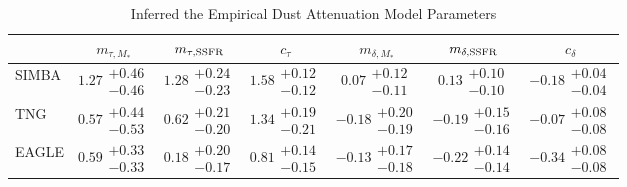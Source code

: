 
\begin{table}
    \caption{Inferred the Empirical Dust Attenuation Model Parameters}
    \begin{tabular}{lcccccc} \toprule
        & $m_{\tau,M_*}$ & $m_{\tau,{\rm SSFR}}$ & $c_\tau$ & $m_{\delta,M_*}$ & $m_{\delta,{\rm SSFR}}$ & $c_\delta$ \\[3pt] \hline\hline
        SIMBA   & $1.27\substack{+0.46\\-0.46}$ &
        $1.28\substack{+0.24\\-0.23}$ & $1.58\substack{+0.12\\-0.12}$ &
        $0.07 \substack{+0.12\\-0.11}$ & $0.13 \substack{+0.10\\-0.10}$ &
        $-0.18\substack{+0.04\\-0.04}$ \\
        TNG     & $0.57\substack{+0.44\\-0.53}$ &
        $0.62\substack{+0.21\\-0.20}$ & $1.34\substack{+0.19\\-0.21}$ &
        $-0.18\substack{+0.20\\-0.19}$ & $-0.19\substack{+0.15\\-0.16}$ &
        $-0.07\substack{+0.08\\-0.08}$ \\
        EAGLE   & $0.59\substack{+0.33\\-0.33}$ &
        $0.18\substack{+0.20\\-0.17}$ & $0.81\substack{+0.14\\-0.15}$ &
        $-0.13\substack{+0.17\\-0.18}$ & $-0.22\substack{+0.14\\-0.14}$ &
        $-0.34\substack{+0.08\\-0.08}$\\
        \hline
    \end{tabular} \label{tab:posterior}
\end{table}

